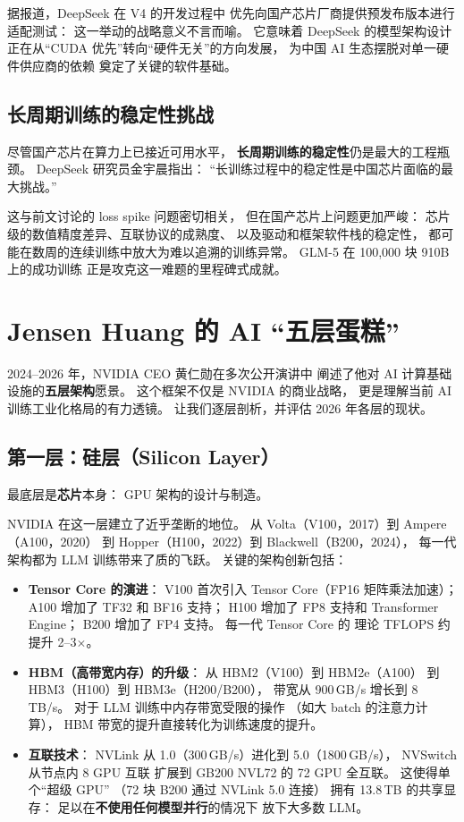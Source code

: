 据报道，DeepSeek 在 V4 的开发过程中
优先向国产芯片厂商提供预发布版本进行适配测试：
这一举动的战略意义不言而喻。
它意味着 DeepSeek 的模型架构设计
正在从“CUDA 优先”转向“硬件无关”的方向发展，
为中国 AI 生态摆脱对单一硬件供应商的依赖
奠定了关键的软件基础。

\subsection{长周期训练的稳定性挑战}

尽管国产芯片在算力上已接近可用水平，
\textbf{长周期训练的稳定性}仍是最大的工程瓶颈。
DeepSeek 研究员金宇晨指出：
“长训练过程中的稳定性是中国芯片面临的最大挑战。”

这与前文讨论的 loss spike 问题密切相关，
但在国产芯片上问题更加严峻：
芯片级的数值精度差异、互联协议的成熟度、
以及驱动和框架软件栈的稳定性，
都可能在数周的连续训练中放大为难以追溯的训练异常。
GLM-5 在 100,000 块 910B 上的成功训练
正是攻克这一难题的里程碑式成就。

\section{Jensen Huang 的 AI “五层蛋糕”}
\label{sec:five-layers}

2024--2026 年，NVIDIA CEO 黄仁勋在多次公开演讲中
阐述了他对 AI 计算基础设施的\textbf{五层架构}愿景。
这个框架不仅是 NVIDIA 的商业战略，
更是理解当前 AI 训练工业化格局的有力透镜。
让我们逐层剖析，并评估 2026 年各层的现状。

\subsection{第一层：硅层（Silicon Layer）}

最底层是\textbf{芯片}本身：
GPU 架构的设计与制造。

NVIDIA 在这一层建立了近乎垄断的地位。
从 Volta（V100，2017）到 Ampere（A100，2020）
到 Hopper（H100，2022）到 Blackwell（B200，2024），
每一代架构都为 LLM 训练带来了质的飞跃。
关键的架构创新包括：

\begin{itemize}[noitemsep]
  \item \textbf{Tensor Core 的演进}：
        V100 首次引入 Tensor Core（FP16 矩阵乘法加速）；
        A100 增加了 TF32 和 BF16 支持；
        H100 增加了 FP8 支持和 Transformer Engine；
        B200 增加了 FP4 支持。
        每一代 Tensor Core 的
        理论 TFLOPS 约提升 2--3$\times$。
  \item \textbf{HBM（高带宽内存）的升级}：
        从 HBM2（V100）到 HBM2e（A100）
        到 HBM3（H100）到 HBM3e（H200/B200），
        带宽从 900\,GB/s 增长到 8\,TB/s。
        对于 LLM 训练中内存带宽受限的操作
        （如大 batch 的注意力计算），
        HBM 带宽的提升直接转化为训练速度的提升。
  \item \textbf{互联技术}：
        NVLink 从 1.0（300\,GB/s）进化到 5.0（1800\,GB/s），
        NVSwitch 从节点内 8 GPU 互联
        扩展到 GB200 NVL72 的 72 GPU 全互联。
        这使得单个“超级 GPU”
        （72 块 B200 通过 NVLink 5.0 连接）
        拥有 13.8\,TB 的共享显存：
        足以在\textbf{不使用任何模型并行}的情况下
        放下大多数 LLM。
\end{itemize}


